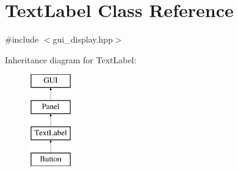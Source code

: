 \hypertarget{class_text_label}{}\section{Text\+Label Class Reference}
\label{class_text_label}


{\ttfamily \#include $<$gui\+\_\+display.\+hpp$>$}

Inheritance diagram for Text\+Label\+:\begin{figure}[H]
\begin{center}
\leavevmode
\includegraphics[height=4.000000cm]{class_text_label}
\end{center}
\end{figure}
